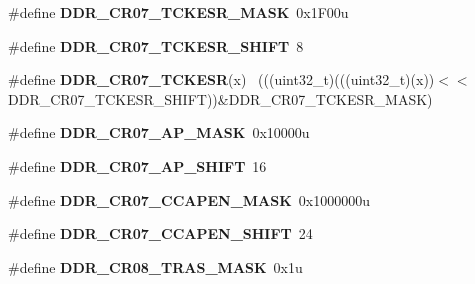 \begin{DoxyCompactItemize}
\item 
\hypertarget{group___d_d_r___register___masks_gac417ad253bce276e439a36beb3a6ed36}{}\#define {\bfseries D\+D\+R\+\_\+\+C\+R07\+\_\+\+T\+C\+K\+E\+S\+R\+\_\+\+M\+A\+S\+K}~0x1\+F00u\label{group___d_d_r___register___masks_gac417ad253bce276e439a36beb3a6ed36}

\item 
\hypertarget{group___d_d_r___register___masks_ga6b351d63ccfb1168e3024f09acc3e3ef}{}\#define {\bfseries D\+D\+R\+\_\+\+C\+R07\+\_\+\+T\+C\+K\+E\+S\+R\+\_\+\+S\+H\+I\+F\+T}~8\label{group___d_d_r___register___masks_ga6b351d63ccfb1168e3024f09acc3e3ef}

\item 
\hypertarget{group___d_d_r___register___masks_ga27170b9488f826f51c2f4c4a46217ce5}{}\#define {\bfseries D\+D\+R\+\_\+\+C\+R07\+\_\+\+T\+C\+K\+E\+S\+R}(x)                                          ~(((uint32\+\_\+t)(((uint32\+\_\+t)(x))$<$$<$D\+D\+R\+\_\+\+C\+R07\+\_\+\+T\+C\+K\+E\+S\+R\+\_\+\+S\+H\+I\+F\+T))\&D\+D\+R\+\_\+\+C\+R07\+\_\+\+T\+C\+K\+E\+S\+R\+\_\+\+M\+A\+S\+K)\label{group___d_d_r___register___masks_ga27170b9488f826f51c2f4c4a46217ce5}

\item 
\hypertarget{group___d_d_r___register___masks_ga341ea9f92e1aa385bdfcdb6661dba360}{}\#define {\bfseries D\+D\+R\+\_\+\+C\+R07\+\_\+\+A\+P\+\_\+\+M\+A\+S\+K}~0x10000u\label{group___d_d_r___register___masks_ga341ea9f92e1aa385bdfcdb6661dba360}

\item 
\hypertarget{group___d_d_r___register___masks_ga5e3aa6105e1e9d2689160354dd89c5be}{}\#define {\bfseries D\+D\+R\+\_\+\+C\+R07\+\_\+\+A\+P\+\_\+\+S\+H\+I\+F\+T}~16\label{group___d_d_r___register___masks_ga5e3aa6105e1e9d2689160354dd89c5be}

\item 
\hypertarget{group___d_d_r___register___masks_ga5b575a44cd2000e7b9791295cc91db7d}{}\#define {\bfseries D\+D\+R\+\_\+\+C\+R07\+\_\+\+C\+C\+A\+P\+E\+N\+\_\+\+M\+A\+S\+K}~0x1000000u\label{group___d_d_r___register___masks_ga5b575a44cd2000e7b9791295cc91db7d}

\item 
\hypertarget{group___d_d_r___register___masks_gad016669f9e05f8e061beab81a61404ca}{}\#define {\bfseries D\+D\+R\+\_\+\+C\+R07\+\_\+\+C\+C\+A\+P\+E\+N\+\_\+\+S\+H\+I\+F\+T}~24\label{group___d_d_r___register___masks_gad016669f9e05f8e061beab81a61404ca}

\item 
\hypertarget{group___d_d_r___register___masks_ga4b001bf86ca73a5bdcb3d218c8faa735}{}\#define {\bfseries D\+D\+R\+\_\+\+C\+R08\+\_\+\+T\+R\+A\+S\+\_\+\+M\+A\+S\+K}~0x1u\label{group___d_d_r___register___masks_ga4b001bf86ca73a5bdcb3d218c8faa735}


\end{DoxyCompactItemize}
